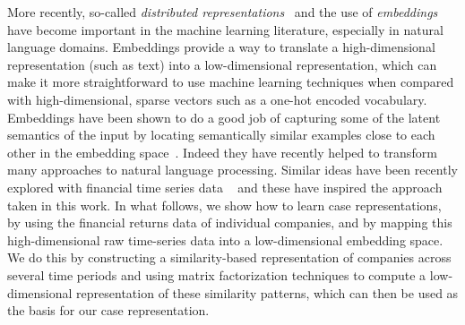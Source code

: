 \documentclass[runningheads]{llncs}
\begin{document}

More recently, so-called \emph{distributed representations}~\cite{mikolov2013efficient} and the use of \emph{embeddings} have become important in the machine learning literature, especially in natural language domains. Embeddings provide a way to translate a high-dimensional representation (such as text) into a low-dimensional representation, which can make it more straightforward to use machine learning techniques when compared with high-dimensional, sparse vectors such as a one-hot encoded vocabulary. Embeddings have been shown to do a good job of capturing some of the latent semantics of the input by locating semantically similar examples close to each other in the embedding space~\cite{mikolov2013efficient}. Indeed they have recently helped to transform many approaches to natural language processing. Similar ideas have been recently explored with financial time series data ~\cite{dolphin2022embeddings,dolphin2023machine} and these have inspired the approach taken in this work. In what follows, we show how to learn case representations, by using the financial returns data of individual companies, and by mapping this high-dimensional raw time-series data into a low-dimensional embedding space. We do this by constructing a similarity-based representation of companies across several time periods and using matrix factorization techniques to compute a low-dimensional representation of these similarity patterns, which can then be used as the basis for our case representation.

\end{document}
